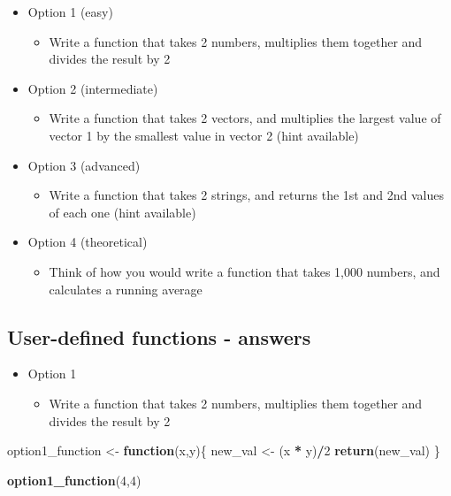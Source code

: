 \documentclass[]{article}
\newenvironment{Shaded}{\begin{snugshade}}{\end{snugshade}}
\newcommand{\KeywordTok}[1]{\textcolor[rgb]{0.13,0.29,0.53}{\textbf{#1}}}
\newcommand{\DecValTok}[1]{\textcolor[rgb]{0.00,0.00,0.81}{#1}}
\newcommand{\StringTok}[1]{\textcolor[rgb]{0.31,0.60,0.02}{#1}}
\newcommand{\ControlFlowTok}[1]{\textcolor[rgb]{0.13,0.29,0.53}{\textbf{#1}}}
\newcommand{\OperatorTok}[1]{\textcolor[rgb]{0.81,0.36,0.00}{\textbf{#1}}}
\newcommand{\NormalTok}[1]{#1}
\providecommand{\tightlist}{%
  \setlength{\itemsep}{0pt}\setlength{\parskip}{0pt}}
\begin{document}
\begin{itemize}
\tightlist
\item
  Option 1 (easy)

  \begin{itemize}
  \tightlist
  \item
    Write a function that takes 2 numbers, multiplies them together and
    divides the result by 2
  \end{itemize}
\item
  Option 2 (intermediate)

  \begin{itemize}
  \tightlist
  \item
    Write a function that takes 2 vectors, and multiplies the largest
    value of vector 1 by the smallest value in vector 2 (hint available)
  \end{itemize}
\item
  Option 3 (advanced)

  \begin{itemize}
  \tightlist
  \item
    Write a function that takes 2 strings, and returns the 1st and 2nd
    values of each one (hint available)
  \end{itemize}
\item
  Option 4 (theoretical)

  \begin{itemize}
  \tightlist
  \item
    Think of how you would write a function that takes 1,000 numbers,
    and calculates a running average
  \end{itemize}
\end{itemize}

\subsection{User-defined functions -
answers}\label{user-defined-functions---answers}

\begin{itemize}
\tightlist
\item
  Option 1

  \begin{itemize}
  \tightlist
  \item
    Write a function that takes 2 numbers, multiplies them together and
    divides the result by 2
  \end{itemize}
\end{itemize}

\begin{Shaded}
\begin{Highlighting}[]
\NormalTok{option1_function <-}\StringTok{ }\ControlFlowTok{function}\NormalTok{(x,y)\{}
\NormalTok{  new_val <-}\StringTok{ }\NormalTok{(x }\OperatorTok{*}\StringTok{ }\NormalTok{y)}\OperatorTok{/}\DecValTok{2}
  \KeywordTok{return}\NormalTok{(new_val)}
\NormalTok{\}}

\KeywordTok{option1_function}\NormalTok{(}\DecValTok{4}\NormalTok{,}\DecValTok{4}\NormalTok{)}
\end{Highlighting}
\end{Shaded}
\end{document}

